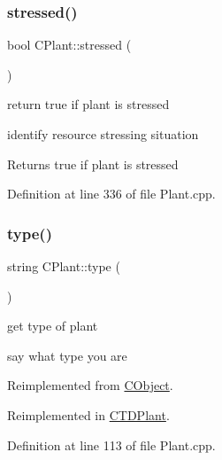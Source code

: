 \mbox{\label{class_c_plant_a49fa0d1fb6b432339c5156fe31cabf58}} 
\subsubsection{\texorpdfstring{stressed()}{stressed()}}
{\footnotesize\ttfamily bool C\+Plant\+::stressed (\begin{DoxyParamCaption}{ }\end{DoxyParamCaption})\hspace{0.3cm}{\ttfamily [virtual]}}



return true if plant is stressed 

identify resource stressing situation \begin{DoxyReturn}{Returns}
true if plant is stressed 
\end{DoxyReturn}


Definition at line 336 of file Plant.\+cpp.

\mbox{\label{class_c_plant_a6f01bbbf4d15243a1e00e85ce1a9de5b}} 
\subsubsection{\texorpdfstring{type()}{type()}}
{\footnotesize\ttfamily string C\+Plant\+::type (\begin{DoxyParamCaption}{ }\end{DoxyParamCaption})\hspace{0.3cm}{\ttfamily [virtual]}}



get type of plant 

say what type you are 

Reimplemented from \mbox{\hyperlink{class_c_object_aa734daa745223aa287c3fdfb8dfca1ed}{C\+Object}}.



Reimplemented in \mbox{\hyperlink{class_c_t_d_plant_a4bed9454fd2fd6fa37109b544017361b}{C\+T\+D\+Plant}}.



Definition at line 113 of file Plant.\+cpp.

\mbox{\label{class_c_plant_a1e8eb53d535dea92050fcb19dcbb9538}} 
